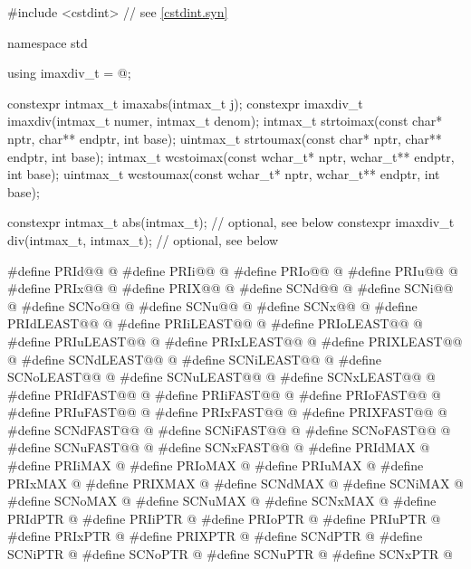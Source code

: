 \begin{codeblock}
#include <cstdint>  // see \ref{cstdint.syn}

namespace std {
  using imaxdiv_t = @\seebelow@;

  constexpr intmax_t imaxabs(intmax_t j);
  constexpr imaxdiv_t imaxdiv(intmax_t numer, intmax_t denom);
  intmax_t strtoimax(const char* nptr, char** endptr, int base);
  uintmax_t strtoumax(const char* nptr, char** endptr, int base);
  intmax_t wcstoimax(const wchar_t* nptr, wchar_t** endptr, int base);
  uintmax_t wcstoumax(const wchar_t* nptr, wchar_t** endptr, int base);

  constexpr intmax_t abs(intmax_t);             // optional, see below
  constexpr imaxdiv_t div(intmax_t, intmax_t);  // optional, see below
}

#define PRId@@ @\seebelow@
#define PRIi@@ @\seebelow@
#define PRIo@@ @\seebelow@
#define PRIu@@ @\seebelow@
#define PRIx@@ @\seebelow@
#define PRIX@@ @\seebelow@
#define SCNd@@ @\seebelow@
#define SCNi@@ @\seebelow@
#define SCNo@@ @\seebelow@
#define SCNu@@ @\seebelow@
#define SCNx@@ @\seebelow@
#define PRIdLEAST@@ @\seebelow@
#define PRIiLEAST@@ @\seebelow@
#define PRIoLEAST@@ @\seebelow@
#define PRIuLEAST@@ @\seebelow@
#define PRIxLEAST@@ @\seebelow@
#define PRIXLEAST@@ @\seebelow@
#define SCNdLEAST@@ @\seebelow@
#define SCNiLEAST@@ @\seebelow@
#define SCNoLEAST@@ @\seebelow@
#define SCNuLEAST@@ @\seebelow@
#define SCNxLEAST@@ @\seebelow@
#define PRIdFAST@@ @\seebelow@
#define PRIiFAST@@ @\seebelow@
#define PRIoFAST@@ @\seebelow@
#define PRIuFAST@@ @\seebelow@
#define PRIxFAST@@ @\seebelow@
#define PRIXFAST@@ @\seebelow@
#define SCNdFAST@@ @\seebelow@
#define SCNiFAST@@ @\seebelow@
#define SCNoFAST@@ @\seebelow@
#define SCNuFAST@@ @\seebelow@
#define SCNxFAST@@ @\seebelow@
#define PRIdMAX @\seebelow@
#define PRIiMAX @\seebelow@
#define PRIoMAX @\seebelow@
#define PRIuMAX @\seebelow@
#define PRIxMAX @\seebelow@
#define PRIXMAX @\seebelow@
#define SCNdMAX @\seebelow@
#define SCNiMAX @\seebelow@
#define SCNoMAX @\seebelow@
#define SCNuMAX @\seebelow@
#define SCNxMAX @\seebelow@
#define PRIdPTR @\seebelow@
#define PRIiPTR @\seebelow@
#define PRIoPTR @\seebelow@
#define PRIuPTR @\seebelow@
#define PRIxPTR @\seebelow@
#define PRIXPTR @\seebelow@
#define SCNdPTR @\seebelow@
#define SCNiPTR @\seebelow@
#define SCNoPTR @\seebelow@
#define SCNuPTR @\seebelow@
#define SCNxPTR @\seebelow@
\end{codeblock}

